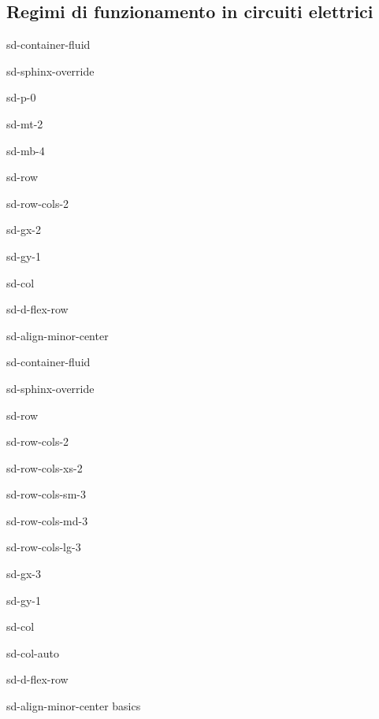 \documentclass[letterpaper,10pt,italian]{jupyterBook}
\begin{document}
\subsection{Regimi di funzionamento in circuiti elettrici}
\label{\detokenize{ch/circuits-electric-regimes:regimi-di-funzionamento-in-circuiti-elettrici}}\label{\detokenize{ch/circuits-electric-regimes:classical-electromagnetism-circuits-electric-regimes}}\label{\detokenize{ch/circuits-electric-regimes::doc}}
\sphinxstepscope

\begin{sphinxuseclass}{sd-container-fluid}
\begin{sphinxuseclass}{sd-sphinx-override}
\begin{sphinxuseclass}{sd-p-0}
\begin{sphinxuseclass}{sd-mt-2}
\begin{sphinxuseclass}{sd-mb-4}
\begin{sphinxuseclass}{sd-row}
\begin{sphinxuseclass}{sd-row-cols-2}
\begin{sphinxuseclass}{sd-gx-2}
\begin{sphinxuseclass}{sd-gy-1}
\begin{sphinxuseclass}{sd-col}
\begin{sphinxuseclass}{sd-d-flex-row}
\begin{sphinxuseclass}{sd-align-minor-center}
\begin{sphinxuseclass}{sd-container-fluid}
\begin{sphinxuseclass}{sd-sphinx-override}
\begin{sphinxuseclass}{sd-row}
\begin{sphinxuseclass}{sd-row-cols-2}
\begin{sphinxuseclass}{sd-row-cols-xs-2}
\begin{sphinxuseclass}{sd-row-cols-sm-3}
\begin{sphinxuseclass}{sd-row-cols-md-3}
\begin{sphinxuseclass}{sd-row-cols-lg-3}
\begin{sphinxuseclass}{sd-gx-3}
\begin{sphinxuseclass}{sd-gy-1}
\begin{sphinxuseclass}{sd-col}
\begin{sphinxuseclass}{sd-col-auto}
\begin{sphinxuseclass}{sd-d-flex-row}
\begin{sphinxuseclass}{sd-align-minor-center}
\sphinxAtStartPar
basics


\end{sphinxuseclass}
\end{sphinxuseclass}
\end{sphinxuseclass}
\end{sphinxuseclass}
\end{sphinxuseclass}
\end{sphinxuseclass}
\end{sphinxuseclass}
\end{sphinxuseclass}
\end{sphinxuseclass}
\end{sphinxuseclass}
\end{sphinxuseclass}
\end{sphinxuseclass}
\end{sphinxuseclass}
\end{sphinxuseclass}
\end{sphinxuseclass}
\end{sphinxuseclass}
\end{sphinxuseclass}
\end{sphinxuseclass}
\end{sphinxuseclass}
\end{sphinxuseclass}
\end{sphinxuseclass}
\end{sphinxuseclass}
\end{sphinxuseclass}
\end{sphinxuseclass}
\end{sphinxuseclass}
\end{sphinxuseclass}
\end{document}
